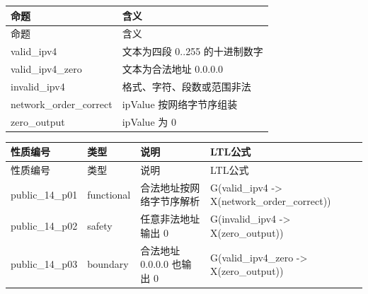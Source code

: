 \begin{longtable}{L{3.3cm}L{10.0cm}}

\toprule

命题 & 含义\\

\midrule

\endfirsthead

\toprule

命题 & 含义\\

\midrule

\endhead

{\ttfamily valid\_ipv4} & 文本为四段 0..255 的十进制数字\\

{\ttfamily valid\_ipv4\_zero} & 文本为合法地址 0.0.0.0\\

{\ttfamily invalid\_ipv4} & 格式、字符、段数或范围非法\\

{\ttfamily network\_order\_correct} & ipValue 按网络字节序组装\\

{\ttfamily zero\_output} & ipValue 为 0\\

\bottomrule

\end{longtable}

\begin{longtable}{L{2.3cm}L{1.7cm}L{4.1cm}L{5.2cm}}

\toprule

性质编号 & 类型 & 说明 & LTL公式\\

\midrule

\endfirsthead

\toprule

性质编号 & 类型 & 说明 & LTL公式\\

\midrule

\endhead

{\ttfamily public\_14\_p01} & functional & 合法地址按网络字节序解析 & {\ttfamily G(valid\_ipv4 -> X(network\_order\_correct))}\\

{\ttfamily public\_14\_p02} & safety & 任意非法地址输出 0 & {\ttfamily G(invalid\_ipv4 -> X(zero\_output))}\\

{\ttfamily public\_14\_p03} & boundary & 合法地址 0.0.0.0 也输出 0 & {\ttfamily G(valid\_ipv4\_zero -> X(zero\_output))}\\

\bottomrule

\end{longtable}

